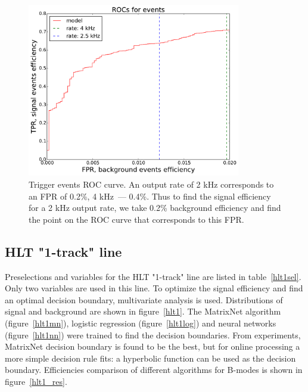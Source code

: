 \documentclass[a4paper]{jpconf}
\begin{document}
\begin{figure}[h]
\includegraphics[width=22pc]{../images/roc_events.pdf}\hspace{2pc}%
\begin{minipage}[b]{14pc}\caption{\label{roc} Trigger events ROC curve. An output rate of 2 kHz corresponds to an FPR of 0.2\%, 4 kHz~--- 0.4\%. Thus to find the signal efficiency for a 2 kHz output rate, we take 0.2\% background efficiency and find the point on the ROC curve that corresponds to this FPR.}
\end{minipage}
\end{figure}

\subsection{HLT "1-track" line}
Preselections and variables for the HLT "1-track" line are listed in table~\ref{hlt1sel}. Only two variables are used in this line. To optimize the signal efficiency and find an optimal decision boundary,  multivariate analysis is used. Distributions of signal and background are shown in figure~\ref{hlt1}. The MatrixNet\cite{mn_paper} algorithm (figure~\ref{hlt1mn}), logistic regression (figure~\ref{hlt1log}) and neural networks (figure~\ref{hlt1nn}) were trained to find the decision boundaries. From experiments, MatrixNet decision boundary is found to be the best, but for online processing a more simple decision rule fits: a hyperbolic function can be used as the decision boundary. Efficiencies comparison of different algorithms for B-modes is shown in figure~\ref{hlt1_res}.
\end{document}

